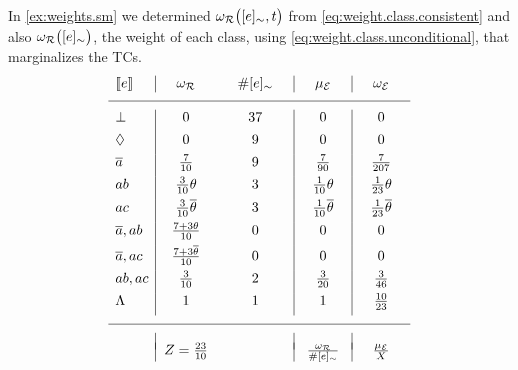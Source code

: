 \documentclass[x11names]{tlp}
\begin{document}
\ifExamples
	\begin{example}\label{ex:choerent.probability}\em

		In \cref{ex:weights.sm} we determined $\wgtc{\class{e}, t}$ from
		\cref{eq:weight.class.consistent} and also $\wgtc{\class{e}}$, the weight of
		each class, using \cref{eq:weight.class.unconditional}, that marginalizes
		the \aclp{TC}.
		\begin{equation*}
			\begin{array}{l|cc|c|c}
				\stablecore{e}
				       & \hspace{1em}\wgtC\hspace{1em}
				       & \hspace{1em}\#\class{e}\hspace{1em}
				       & \hspace{1em}\pwE\hspace{1em}
				       & \hspace{1em}\wgtE\hspace{1em}
				\\
				\hline
				\inconsistent
				       & 0
				       & 37
				       & 0
				       & 0
				\\[4pt]
				\indepclass
				       & 0
				       & 9
				       & 0
				       & 0
				\\[4pt]
				\co{a}
				       & \frac{7}{10}
				       & 9
				       & \frac{7}{90}
				       & \frac{7}{207}
				\\[4pt]
				ab     & \frac{3}{10}\theta                  & 3 & \frac{1}{10}\theta      & \frac{1}{23}\theta \\[4pt]
				ac     & \frac{3}{10}\co{\theta}             & 3 & \frac{1}{10}\co{\theta} &
				\frac{1}{23}\co{\theta}                                                                         \\[4pt]
				\co{a}, ab
				       & \frac{7 + 3\theta}{10}
				       & 0
				       & 0
				       & 0
				\\[4pt]
				\co{a}, ac
				       & \frac{7 + 3\co{\theta}}{10}
				       & 0
				       & 0
				       & 0
				\\[4pt]
				ab, ac & \frac{3}{10}                        & 2 & \frac{3}{20}            & \frac{3}{46}       \\[4pt]
				\consequenceclass
				       & 1
				       & 1
				       & 1
				       & \frac{10}{23}
				\\[4pt]
				\hline
				       &
				       &
				       &
				       &
				\\[-0.5em]
				       & Z = \frac{23}{10}
				       &
				       & \frac{\wgtC}{\#\class{e}}
				       & \frac{\pwE}{X}
			\end{array}
		\end{equation*}


\end{example}
\end{document}
